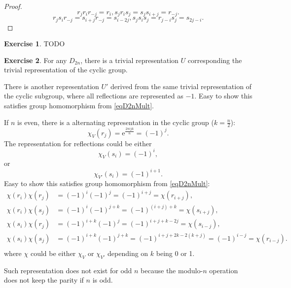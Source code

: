 \documentclass[12pt, letterpaper]{article}
\newcommand{\ee}{\mathrm{e}}
\newcommand{\red}[1]{{\color{red} #1}}
\theoremstyle{definition}
\theoremstyle{remark}
\theoremstyle{definition}
\newtheorem{exe}{Exercise}[section]
\theoremstyle{plain}
\numberwithin{equation}{section}
\begin{document}
	\begin{proof}
		\[r_jr_ir_{-j}=r_i,s_jr_is_{j}=s_{j}s_{i+j}=r_{-j}.\]
		\[r_js_ir_{-j}=s_{i+j}r_{-j}=s_{i-2j},s_js_is_j=r_{j-i}s_{j}=s_{2j-i}.\]
	\end{proof}
	\begin{exe}
		\red{TODO}
	\end{exe}
	\begin{exe}
		For any $D_{2n}$, there is a trivial representation $U$ corresponding the trivial representation of the cyclic group.
		
		There is another representation $U'$ derived from the same trivial representation of the cyclic subgroup,
		where all reflections are represented as $-1$.
		Easy to show this satisfies group homomorphism from \eqref{eqD2nMult}.
		
		If $n$ is even, there is a alternating representation in the cyclic group ($k=\frac{n}{2}$):
		\[\chi_V(r_j)=\ee^{\frac{2\pi ijk}{n}}=(-1)^{j}.\]
		The representation for reflections could be either
		\[\chi_V(s_i)=(-1)^{i},\]
		or
		\[\chi_{V'}(s_i)=(-1)^{i+1}.\]
		Easy to show this satisfies group homomorphism from \eqref{eqD2nMult}:
		\[\begin{aligned}
			\chi(r_i)\chi(r_j)&=(-1)^{i}(-1)^{j}=(-1)^{i+j}=\chi(r_{i+j}),\\
			\chi(r_i)\chi(s_j)&=(-1)^{i}(-1)^{j+k}=(-1)^{(i+j)+k}=\chi(s_{i+j}),\\
			\chi(s_i)\chi(r_j)&=(-1)^{i+k}(-1)^{j}=(-1)^{i+j+k-2j}=\chi(s_{i-j}),\\
			\chi(s_i)\chi(s_j)&=(-1)^{i+k}(-1)^{j+k}=(-1)^{i+j+2k-2(k+j)}=(-1)^{i-j}=\chi(r_{i-j}).\\
		\end{aligned} \]
		where $\chi$ could be either $\chi_V$ or $\chi_{V'}$ depending on $k$ being 0 or 1.
		
		Such representation does not exist for odd $n$
		because the modulo-$n$ operation does not keep the parity if $n$ is odd.


\end{exe}
\end{document}
